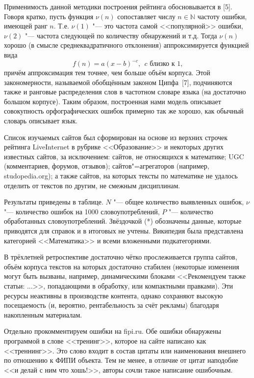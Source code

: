 Применимость данной методики построения рейтинга \lb обосновывается в [5].
Говоря кратко, пусть функция $\nu(n)$ сопоставляет числу $n\in\mathbb{N}$
частоту ошибки, имеющей ранг $n$.
Т.е. $\nu(1)$ "--- это частота самой <<популярной>> ошибки,
$\nu(2)$ "--- частота следующей по количеству обнаружений и т.д.
Тогда $\nu(n)$ хорошо (в смысле среднеквадратичного отклонения)
аппроксимируется функцией вида
\begin{equation*}
	f(n) = a(x-b)^{-c}, ~~\mbox{$c$ близко к 1,}
\end{equation*}
причём аппроксимация тем точнее, чем больше объём корпуса.
Этой закономерности, называемой обобщённым законом Ципфа~[7],
подчиняются также и ранговые распределения слов в частотном словаре языка (на достаточно большом корпусе).
Таким образом, построенная нами модель описывает совокупность орфографических ошибок примерно так же хорошо,
как обычный словарь описывает язык.


Список изучаемых сайтов был сформирован на основе из верхних строчек рейтинга LiveInternet в рубрике <<Образование>>
и некоторых других известных сайтов,
за исключением:
сайтов, не относящихся к математике;
UGC (комментариев, форумов, отзывов);
сайтов"=агрегаторов (например, studopedia.org);
а также сайтов, на которых тексты по математике не удалось отделить от текстов по другим,
не смежным дисциплинам.

Результаты приведены в таблице.
$N$ "--- общее количество выявленных ошибок,
$\nu$ "--- количество ошибок на 1000 словоупотреблений,
$P$ "--- количество обработанных словоупотреблений.
Звёздочкой (*) обозначены данные, которые приводятся для справок и в итоговых не учтены.
Википедия была представлена категорией <<Математика>> и всеми вложенными подкатегориями.

В трёхлетней ретроспективе достаточно чётко прослеживается группа сайтов,
объём корпуса текстов на которых достаточно стабилен
(некоторые изменения могут быть вызваны, например,
динамическими блоками <<Рекомендуем также статьи: ...>>,
попадающими в обработку,
или компактными правками).
Эти ресурсы неактивны в производстве контента,
однако сохраняют высокую посещаемость (и, вероятно, рентабельность за счёт рекламы)
благодаря накопленным материалам.

Отдельно прокомментируем ошибки на fipi.ru.
Обе ошибки обнаружены программой в слове <<тренинг>>,
которое на сайте написано как <<треннинг>>.
Это слово входит в состав цитаты или наименования внешнего по отношению к \mbox{ФИПИ} объекта.
Тем не менее, в отличие от цитат наподобие <<и делай с ним что хошь!>>,
авторы сочли такое написание ошибочным.

